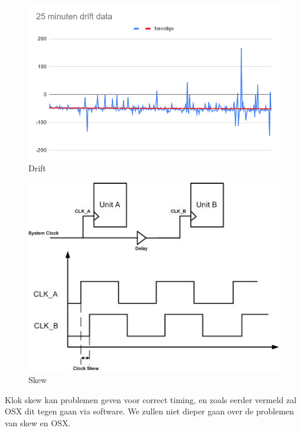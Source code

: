 \begin{figure}[H]
\centering
\includegraphics[scale=0.3]{img/drift.png}
\caption{Drift} \label{drift}
\end{figure}

\begin{figure}[H]
\centering
\includegraphics[scale=0.7]{img/skew.jpg}
\caption{Skew} \label{skew1}
\end{figure}


Klok skew kan problemen geven voor correct timing, en zoals eerder vermeld zal OSX dit tegen gaan via software. We zullen niet dieper gaan over de problemen van skew en OSX. 


